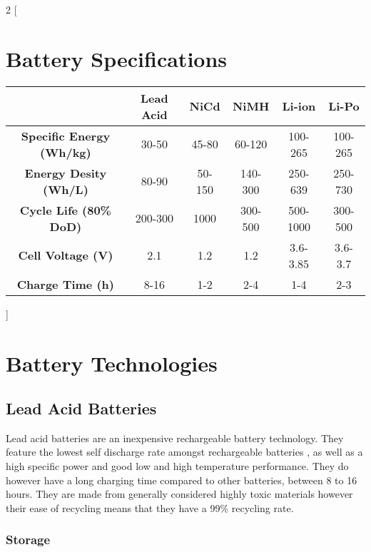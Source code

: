 \documentclass[a4paper,11pt]{article}
\begin{document}
\begin{multicols}{2}
[
\section{Battery Specifications}
\begin{center}
    \begin{tabular}{ |c|c|c|c|c|c| } 
     \hline
                                & \textbf{Lead Acid} & \textbf{NiCd} &  \textbf{NiMH} & \textbf{Li-ion} & \textbf{Li-Po}\\
        \hline
        \textbf{Specific Energy (Wh/kg)} & 30-50     & 45-80        & 60-120 & 100-265 & 100-265\\
        \hline
        \textbf{Energy Desity (Wh/L)}    & 80-90 & 50-150 & 140-300 & 250-639 & 250-730 \\        
        \hline
        \textbf{Cycle Life  (80\% DoD)}  & 200-300 & 1000 & 300-500 & 500-1000 & 300-500 \\
        \hline
        \textbf{Cell Voltage (V)}        & 2.1 & 1.2 & 1.2 & 3.6-3.85 & 3.6-3.7 \\
        \hline
        \textbf{Charge Time (h)}         & 8-16 & 1-2 & 2-4 & 1-4 & 2-3 \\
     \hline
    \end{tabular}
    \end{center}
    \vspace{10pt}
]

\section{Battery Technologies} 

\subsection{Lead Acid Batteries}

Lead acid batteries are an inexpensive rechargeable battery technology. They feature the lowest self discharge rate amongst rechargeable batteries \cite{lead_acid}, as well as a high specific power and good low and high temperature performance. They do however have a long charging time compared to other batteries, between 8 to 16 hours. They are made from generally considered highly toxic materials however their ease of recycling means that they have a 99\% recycling rate. 

\subsubsection{Storage}


\end{multicols}
\end{document}
